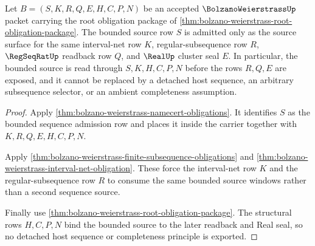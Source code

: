 \begin{theorem}
\label{thm:bolzano-weierstrass-bounded-sequence-admission}
Let $B=(S,K,R,Q,E,H,C,P,N)$ be an accepted $\BolzanoWeierstrassUp$ packet carrying the root obligation package of \autoref{thm:bolzano-weierstrass-root-obligation-package}. The bounded source row $S$ is admitted only as the source surface for the same interval-net row $K$, regular-subsequence row $R$, $\RegSeqRatUp$ readback row $Q$, and $\RealUp$ cluster seal $E$. In particular, the bounded source is read through $S,K,H,C,P,N$ before the rows $R,Q,E$ are exposed, and it cannot be replaced by a detached host sequence, an arbitrary subsequence selector, or an ambient completeness assumption.
\end{theorem}
\begin{proof}
Apply \autoref{thm:bolzano-weierstrass-namecert-obligations}. It identifies $S$ as the bounded sequence admission row and places it inside the carrier together with $K,R,Q,E,H,C,P,N$.

Apply \autoref{thm:bolzano-weierstrass-finite-subsequence-obligations} and \autoref{thm:bolzano-weierstrass-interval-net-obligation}. These force the interval-net row $K$ and the regular-subsequence row $R$ to consume the same bounded source windows rather than a second sequence source.

Finally use \autoref{thm:bolzano-weierstrass-root-obligation-package}. The structural rows $H,C,P,N$ bind the bounded source to the later readback and Real seal, so no detached host sequence or completeness principle is exported.
\end{proof}

